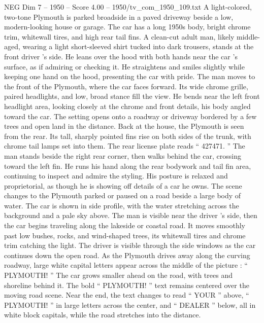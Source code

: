 \begin{textsample}{NEG Dim 7 – 1950 – Score 4.00 – 1950/tv\_com\_1950\_109.txt}  \label{ex:f7_neg_085}
A light-colored, two-tone Plymouth is parked broadside in a paved driveway beside a low, modern-looking house or garage.
The car has a long 1950s body, bright chrome trim, whitewall tires, and high rear tail fins.
A clean-cut adult man, likely middle-aged, wearing a light short-sleeved shirt tucked into dark trousers, stands at the front driver ’s side.
He leans over the hood with both hands near the car ’s surface, as if admiring or checking it.
He straightens and smiles slightly while keeping one hand on the hood, presenting the car with pride.
The man moves to the front of the Plymouth, where the car faces forward.
Its wide chrome grille, paired headlights, and low, broad stance fill the view.
He bends near the left front headlight area, looking closely at the chrome and front details, his body angled toward the car.
The setting opens onto a roadway or driveway bordered by a few trees and open land in the distance.
Back at the house, the Plymouth is seen from the rear.
Its tall, sharply pointed fins rise on both sides of the trunk, with chrome tail lamps set into them.
The rear license plate reads “ 427471. ” The man stands beside the right rear corner, then walks behind the car, crossing toward the left fin.
He runs his hand along the rear bodywork and tail fin area, continuing to inspect and admire the styling.
His posture is relaxed and proprietorial, as though he is showing off details of a car he owns.
The scene changes to the Plymouth parked or paused on a road beside a large body of water.
The car is shown in side profile, with the water stretching across the background and a pale sky above.
The man is visible near the driver ’s side, then the car begins traveling along the lakeside or coastal road.
It moves smoothly past low bushes, rocks, and wind-shaped trees, its whitewall tires and chrome trim catching the light.
The driver is visible through the side windows as the car continues down the open road.
As the Plymouth drives away along the curving roadway, large white capital letters appear across the middle of the picture : “ PLYMOUTH! ” The car grows smaller ahead on the road, with trees and shoreline behind it.
The bold “ PLYMOUTH! ” text remains centered over the moving road scene.
Near the end, the text changes to read “ YOUR ” above, “ PLYMOUTH! ” in large letters across the center, and “ DEALER ” below, all in white block capitals, while the road stretches into the distance.

\end{textsample}
